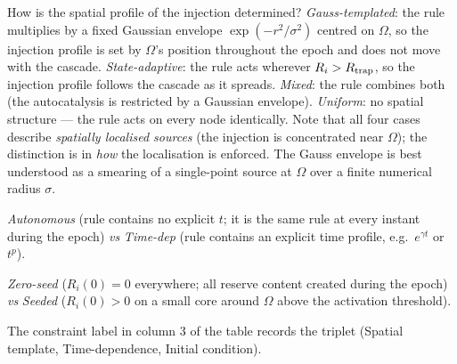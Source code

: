 \documentclass[11pt,a4paper]{article}
\begin{document}
\begin{description}[leftmargin=1.3cm,style=nextline]
\item[\textsc{Spatial template}.] How is the spatial profile of the
injection determined? \emph{Gauss-templated}: the rule multiplies by
a fixed Gaussian envelope $\exp(-r^2/\sigma^2)$ centred on $\Omega$,
so the injection profile is set by $\Omega$'s position throughout the
epoch and does not move with the cascade. \emph{State-adaptive}: the
rule acts wherever $R_i > R_{\rm trap}$, so the injection profile
follows the cascade as it spreads. \emph{Mixed}: the rule combines
both (the autocatalysis is restricted by a Gaussian envelope).
\emph{Uniform}: no spatial structure --- the rule acts on every node
identically. Note that all four cases describe \emph{spatially
localised sources} (the injection is concentrated near $\Omega$); the
distinction is in \emph{how} the localisation is enforced. The
Gauss envelope is best understood as a smearing of a single-point
source at $\Omega$ over a finite numerical radius $\sigma$.

\item[\textsc{Time-dependence}.] \emph{Autonomous} (rule contains no
explicit $t$; it is the same rule at every instant during the epoch)
\emph{vs} \emph{Time-dep} (rule contains an explicit time
profile, e.g.\ $e^{\gamma t}$ or $t^p$).

\item[\textsc{Initial condition}.] \emph{Zero-seed} ($R_i(0) = 0$
everywhere; all reserve content created during the epoch) \emph{vs}
\emph{Seeded} ($R_i(0) > 0$ on a small core around $\Omega$ above the
activation threshold).
\end{description}

The constraint label in column 3 of the table records the triplet
(Spatial template, Time-dependence, Initial condition).
\end{document}

